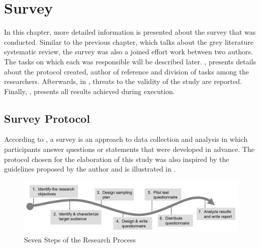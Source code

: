 
\chapter{Survey}\label{survey}

In this chapter, more detailed information is presented about the survey that was conducted. Similar to the previous chapter, which talks about the grey literature systematic review, the survey was also a joined effort work between two authors. The tasks on which each was responsible will be described later. , presents details about the protocol created, author of reference and division of tasks among the researchers. Afterwards, in , threats to the validity of the study are reported. Finally, , presents all results achieved during execution.

\section{Survey Protocol}\label{sec:survey-protocol}

According to \textcite{kasunic2005designing}, a survey is an approach to data collection and analysis in which participants answer questions or statements that were developed in advance. The protocol chosen for the elaboration of this study was also inspired by the guidelines proposed by the author and is illustrated in .

\begin{figure}[!htb]
  \caption{Seven Steps of the Research Process}\label{fig:setepassos}
  \begin{center}
    \includegraphics[width=16cm]{img/5-kasunic-process.png}
  \end{center}
\end{figure}

